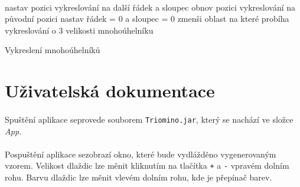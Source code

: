\documentclass[12pt]{scrartcl}
\begin{document}
\paragraph{}
\begin{algorithm}[H]
	 {
		 {
			 {
				\BlankLine
				nastav pozici vykreslování na další řádek a sloupec
				\BlankLine
				\BlankLine
				obnov pozici vykreslování na původní pozici
				\BlankLine
			}
		}
		\BlankLine
			nastav řádek = 0 a sloupec = 0
		\BlankLine
		\BlankLine
			zmenši oblast na které probíha vykreslování o 3 velikosti mnohoúhelníku
		\BlankLine
	}
 \caption{Vykreslení mnohoúhelníků}
\end{algorithm}

\newpage
\section{Uživatelská dokumentace}

\paragraph{}
Spuštění aplikace se\nobreakspace provede souborem \texttt{Triomino.jar}, který se nachází ve složce \emph{App}.

\paragraph{}
Po\nobreakspace spuštění aplikace se\nobreakspace zobrazí okno, které bude vydlážděno vygenerovaným vzorem. Velikost dlaždic lze měnit kliknutím na tlačítka \texttt{+} a \texttt{-} v\nobreakspace pravém dolním rohu. Barvu dlaždic lze měnit v\nobreakspace levém dolním rohu, kde je přepínač barev.	
\end{document}
